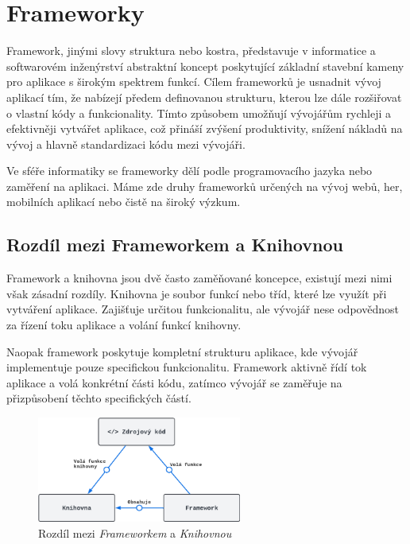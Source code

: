 \section{Frameworky}
\label{sec:dev-framework}
Framework, jinými slovy struktura nebo kostra, představuje v informatice a softwarovém inženýrství abstraktní koncept poskytující základní stavební kameny pro aplikace s širokým spektrem funkcí. Cílem frameworků je usnadnit vývoj aplikací tím, že nabízejí předem definovanou strukturu, kterou lze dále rozšiřovat o vlastní kódy a funkcionality. Tímto způsobem umožňují vývojářům rychleji a efektivněji vytvářet aplikace, což přináší zvýšení produktivity, snížení nákladů na vývoj a hlavně standardizaci kódu mezi vývojáři.

Ve sféře informatiky se frameworky dělí podle programovacího jazyka nebo zaměření na aplikaci. Máme zde druhy frameworků určených na vývoj webů, her, mobilních aplikací nebo čistě na široký výzkum. \cite{about_framework}

\subsection*{Rozdíl mezi Frameworkem a Knihovnou}
Framework a knihovna jsou dvě často zaměňované koncepce, existují mezi nimi však zásadní rozdíly. Knihovna je soubor funkcí nebo tříd, které lze využít při vytváření aplikace. Zajišťuje určitou funkcionalitu, ale vývojář nese odpovědnost za řízení toku aplikace a volání funkcí knihovny.

Naopak framework poskytuje kompletní strukturu aplikace, kde vývojář implementuje pouze specifickou funkcionalitu. Framework aktivně řídí tok aplikace a volá konkrétní části kódu, zatímco vývojář se zaměřuje na přizpůsobení těchto specifických částí.

\begin{figure}[H]
    \centering
    \includegraphics[width=0.6\textwidth]{diagrams/frameworkLibraryDiff}
    \caption{Rozdíl mezi \textit{Frameworkem} a \textit{Knihovnou} \cite{framework_library_difference}}
    \label{fig:framework_library_difference}
\end{figure}

